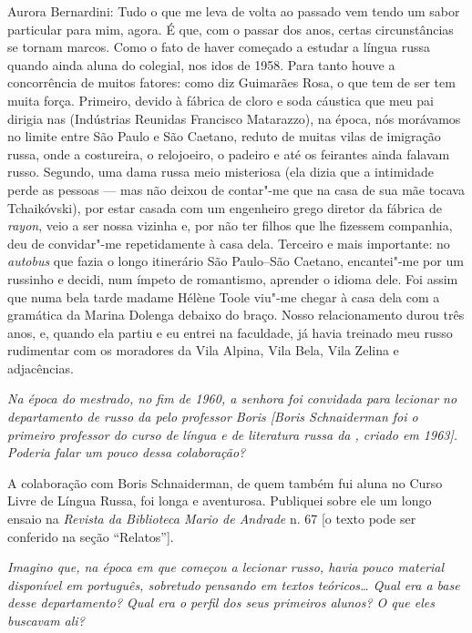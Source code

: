 \noindent
Aurora Bernardini: Tudo o que me leva de volta ao passado vem tendo um sabor particular
para mim, agora. É que, com o passar dos anos, certas circunstâncias se
tornam marcos. Como o fato de haver começado a estudar a língua russa
quando ainda aluna do colegial, nos idos de 1958. Para tanto houve a
concorrência de muitos fatores: como diz Guimarães Rosa, o que tem de
ser tem muita força. Primeiro, devido à fábrica de cloro e soda cáustica
que meu pai dirigia nas  (Indústrias Reunidas Francisco Matarazzo),
na época, nós morávamos no limite entre São Paulo e São Caetano, reduto
de muitas vilas de imigração russa, onde a costureira, o relojoeiro, o
padeiro e até os feirantes ainda falavam russo. Segundo, uma dama russa
meio misteriosa (ela dizia que a intimidade perde as pessoas --- mas não
deixou de contar"-me que na casa de sua mãe tocava Tchaikóvski), por
estar casada com um engenheiro grego diretor da fábrica de \emph{rayon}, veio a
ser nossa vizinha e, por não ter filhos que lhe fizessem companhia, deu
de convidar"-me repetidamente à casa dela. Terceiro e mais importante: no
\emph{autobus} que fazia o longo itinerário São Paulo--São Caetano, encantei"-me
por um russinho e decidi, num ímpeto de romantismo, aprender o idioma
dele. Foi assim que numa bela tarde madame Hélène Toole viu"-me chegar à
casa dela com a gramática da Marina Dolenga debaixo do braço. Nosso
relacionamento durou três anos, e, quando ela partiu e eu entrei na
faculdade, já havia treinado meu russo rudimentar com os moradores da
Vila Alpina, Vila Bela, Vila Zelina e adjacências.

\medskip

\emph{Na época do mestrado, no fim de 1960, a senhora foi convidada para
lecionar no departamento de russo da  pelo professor Boris [Boris
Schnaiderman foi o primeiro professor do curso de língua e de literatura
russa da , criado em 1963]. Poderia falar um pouco dessa
colaboração?}

A colaboração com Boris Schnaiderman, de quem também fui aluna no Curso Livre de Língua Russa, foi longa e
aventurosa. Publiquei sobre ele um longo ensaio na \emph{Revista da
Biblioteca Mario de Andrade} n. 67 [o texto pode ser conferido na seção
``Relatos''].

\medskip

\emph{Imagino que, na época em que começou a lecionar russo, havia pouco
material disponível em português, sobretudo pensando em textos
teóricos\ldots{} Qual era a base desse departamento? Qual era o perfil dos
seus primeiros alunos? O que eles buscavam ali?}

